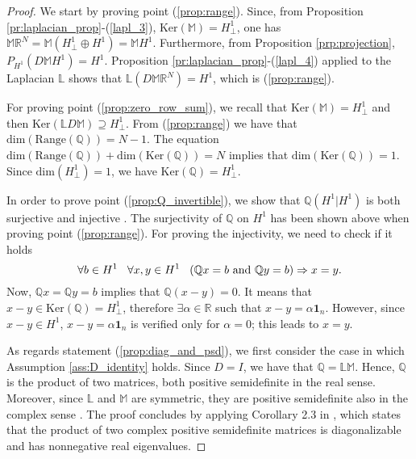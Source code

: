 \documentclass[a4paper]{article}
\theoremstyle{plain}
\begin{document}
\begin{proof}
	We start by proving point (\ref{prop:range}). Since, from Proposition \ref{pr:laplacian_prop}-(\ref{lapl_3}), $\mathrm{Ker}(\mathbb{M}) = H_{\perp}^1$, one has $\mathbb{M}\mathbb{R}^{N}=\mathbb{M}(H_{\perp}^1\oplus H^1) = \mathbb{M} H^1$. Furthermore, from Proposition \ref{prp:projection}, ${P}_{H^1}(D\mathbb{M} H^1) = H^1$. Proposition \ref{pr:laplacian_prop}-(\ref{lapl_4}) applied to the Laplacian $\mathbb{L}$ shows that $\mathbb{L}(D\mathbb{M}\mathbb{R}^N) = H^1$, which is (\ref{prop:range}).
	
	For proving point (\ref{prop:zero_row_sum}), we recall that $\mathrm{Ker}(\mathbb{M}) = H_{\perp}^1$ and then $\mathrm{Ker}(\mathbb{L} D \mathbb{M})\supseteq H_{\perp}^1$. From (\ref{prop:range}) we have that $\mathrm{dim}(\mathrm{Range}(\mathbb{Q})) = N-1$. The equation $\mathrm{dim}(\mathrm{Range}(\mathbb{Q}))+\mathrm{dim}(\mathrm{Ker}(\mathbb{Q})) = N$ implies that $\mathrm{dim}(\mathrm{Ker}(\mathbb{Q})) = 1$. Since $\mathrm{dim}(H_{\perp}^1)=1$, we have $\mathrm{Ker}(\mathbb{Q}) = H_{\perp}^1$.
	
	In order to prove point (\ref{prop:Q_invertible}), we  show that $\mathbb{Q}(H^1|H^1)$ is both surjective and injective \cite[p.~50]{lang1987linear}. The surjectivity of $\mathbb{Q}$ on $H^1$ has been shown above when proving point (\ref{prop:range}). For proving the injectivity, we need to check if it holds
	\begin{equation*}
	\label{eq:injectivity_test}
	\forall b\in H^1\hspace{3mm}\forall x,y \in H^1\hspace{3mm}(\mathbb{Q}x=b \mbox{ and } \mathbb{Q}y=b)\Rightarrow x=y.
	\end{equation*}
	Now, $\mathbb{Q} x =\mathbb{Q} y = b$ implies that $\mathbb{Q}(x-y) = 0$. It means that $ x-y\in \mathrm{Ker}(\mathbb{Q})= H^1_{\perp}$, therefore $\exists\alpha\in{\mathbb{R}}$ such that $x-y = \alpha \mathbf{1}_n$. However, since $x-y\in H^1$, $x-y = \alpha \mathbf{1}_n$ is verified only for $\alpha = 0$; this leads to $x = y$. 
	
	As regards statement (\ref{prop:diag_and_psd}), we first consider the case in which Assumption \ref{ass:D_identity} holds. Since $D = I$, we have that $\mathbb{Q} = \mathbb{L}\mathbb{M}$. Hence, $\mathbb{Q}$ is the product of two matrices, both positive semidefinite in the real sense. Moreover, since $\mathbb{L}$ and $\mathbb{M}$ are symmetric, they are positive semidefinite also in the complex sense
		\cite{pease1965methods}. The proof concludes by applying Corollary 2.3 in \cite{hong1991jordan}, which states that the product of two complex positive
		semidefinite matrices is diagonalizable and has nonnegative real
		eigenvalues. 
	

\end{proof}
\end{document}
